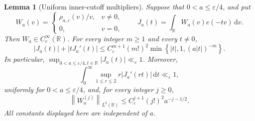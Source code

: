 \documentclass[11pt]{article}
\numberwithin{equation}{section}
\newtheorem{lemma}[theorem]{Lemma}
\theoremstyle{definition}
\newcommand{\R}{\mathbb R}
\newcommand{\1}{\mathbf 1}
\newcommand{\dd}{\,\mathrm d}
\newcommand{\norm}[1]{\left\lVert#1\right\rVert}
\begin{document}
\begin{lemma}[Uniform inner-cutoff multipliers]
\label{lem:near-multiplier}
Suppose that \(0<a\le\varepsilon/4\), and put
\[
 W_a(v)=
 \begin{cases}
  \rho_{a,\varepsilon}(v)/v,&v\ne0,\\
  0,&v=0,
 \end{cases}
 \qquad
 J_a(t)=\int_{\R}W_a(v)e(-tv)\dd v.
\]
Then \(W_a\in C_c^\infty(\R)\).  For every integer \(m\ge1\) and
every \(t\ne0\),
\begin{equation}\label{eq:J-uniform-bounds}
 |J_a(t)|+|tJ_a'(t)|
 \le
 C_\varepsilon^{m+1}(m!)^2
 \min\left\{|t|,1,(a|t|)^{-m}\right\}.
\end{equation}
In particular, \(\sup_{0<a\le\varepsilon/4,t\in\R}|J_a(t)|
\ll_\varepsilon1\).  Moreover,
\begin{equation}\label{eq:J-uniform-envelope}
 \int_0^\infty
 \sup_{1\le r\le2}r|J_a'(rt)|\dd t
 \ll_\varepsilon1,
\end{equation}
uniformly for \(0<a\le\varepsilon/4\), and, for every integer \(j\ge0\),
\begin{equation}\label{eq:W-derivatives}
 \norm{W_a^{(j)}}_{L^2(\R)}
 \le C_\varepsilon^{j+1}(j!)^2a^{-j-1/2}.
\end{equation}
All constants displayed here are independent of \(a\).
\end{lemma}
\end{document}
